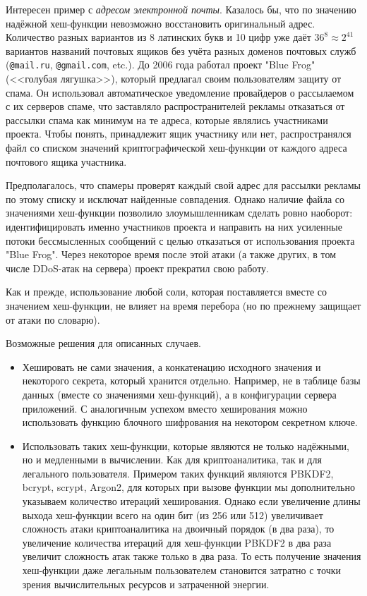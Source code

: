 Интересен пример с \emph{адресом электронной почты}. Казалось бы, что по значению надёжной хеш-функции невозможно восстановить оригинальный адрес. Количество разных вариантов из 8 латинских букв и 10 цифр уже даёт $36^8 \approx 2^{41}$ вариантов названий почтовых ящиков без учёта разных доменов почтовых служб (\texttt{@mail.ru}, \texttt{@gmail.com}, etc.). До 2006 года работал проект "Blue Frog" (<<голубая лягушка>>), который предлагал своим пользователям защиту от спама. Он использовал автоматическое уведомление провайдеров о рассылаемом с их серверов спаме, что заставляло распространителей рекламы отказаться от рассылки спама как минимум на те адреса, которые являлись участниками проекта. Чтобы понять, принадлежит ящик участнику или нет, распространялся файл со списком значений криптографической хеш-функции от каждого адреса почтового ящика участника.

Предполагалось, что спамеры проверят каждый свой адрес для рассылки рекламы по этому списку и исключат найденные совпадения. Однако наличие файла со значениями хеш-функции позволило злоумышленникам сделать ровно наоборот: идентифицировать именно участников проекта и направить на них усиленные потоки бессмысленных сообщений с целью отказаться от использования проекта "Blue Frog". Через некоторое время после этой атаки (а также других, в том числе DDoS-атак на сервера) проект прекратил свою работу.

Как и прежде, использование любой соли, которая поставляется вместе со значением хеш-функции, не влияет на время перебора (но по прежнему защищает от атаки по словарю).

Возможные решения для описанных случаев.

\begin{itemize}
    \item Хешировать не сами значения, а конкатенацию исходного значения и некоторого секрета, который хранится отдельно. Например, не в таблице базы данных (вместе со значениями хеш-функций), а в конфигурации сервера приложений. С аналогичным успехом вместо хеширования можно использовать функцию блочного шифрования на некотором секретном ключе.
    \item Использовать таких хеш-функции, которые являются не только надёжными, но и медленными в вычислении. Как для криптоаналитика, так и для легального пользователя. Примером таких функций являются PBKDF2, bcrypt, scrypt, Argon2, для которых при вызове функции мы дополнительно указываем количество итераций хеширования. Однако если увеличение длины выхода хеш-функции всего на один бит (из 256 или 512) увеличивает сложность атаки криптоаналитика на двоичный порядок (в два раза), то увеличение количества итераций для хеш-функции PBKDF2 в два раза увеличит сложность атак также только в два раза. То есть получение значения хеш-функции даже легальным пользователем становится затратно с точки зрения вычислительных ресурсов и затраченной энергии.
\end{itemize}

